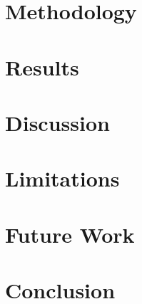 \documentclass[12pt]{article}
\begin{document}
\section{Methodology}




\section{Results}



\section{Discussion}


\section{Limitations}


\section{Future Work}


\section{Conclusion}




\end{document}
